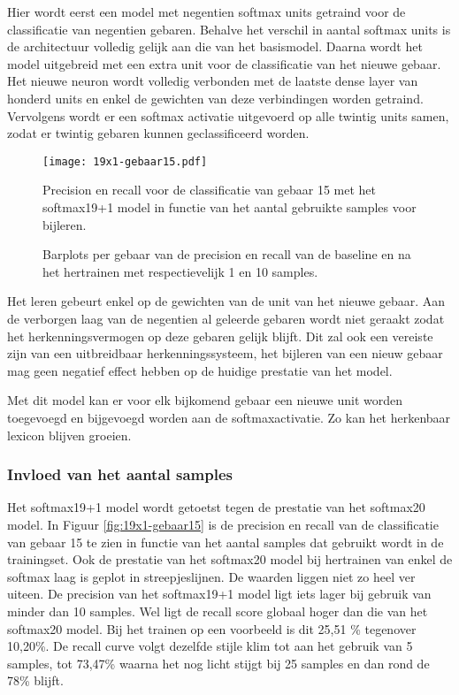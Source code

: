\npar Hier wordt eerst een model met negentien softmax units getraind voor de classificatie van negentien gebaren. Behalve het verschil in aantal softmax units is de architectuur volledig gelijk aan die van het basismodel. Daarna wordt het model uitgebreid met een extra unit voor de classificatie van het nieuwe gebaar. Het nieuwe neuron wordt volledig verbonden met de laatste dense layer van honderd units en enkel de gewichten van deze verbindingen worden getraind. Vervolgens wordt er een softmax activatie uitgevoerd op alle twintig units samen, zodat er twintig gebaren kunnen geclassificeerd worden.

\begin{figure}
	\centering
	\texttt{[image: 19x1-gebaar15.pdf]}
	\caption{Precision en recall voor de classificatie van gebaar 15 met het softmax19+1 model in functie van het aantal gebruikte samples voor bijleren.}\label{fig:19x1-gebaar15}
	
		\vspace{0.5cm}
		\def\svgwidth{1.1\columnwidth}
		
		\caption{Barplots per gebaar van de precision en recall van de baseline en na het hertrainen met respectievelijk 1 en 10 samples. }\label{fig:19x1-all}
\end{figure}

\npar Het leren gebeurt enkel op de gewichten van de unit van het nieuwe gebaar. Aan de verborgen laag van de negentien al geleerde gebaren wordt niet geraakt zodat het herkenningsvermogen op deze gebaren gelijk blijft. Dit zal ook een vereiste zijn van een uitbreidbaar herkenningssysteem, het bijleren van een nieuw gebaar mag geen negatief effect hebben op de huidige prestatie van het model.

\npar Met dit model kan er voor elk bijkomend gebaar een nieuwe unit worden toegevoegd en bijgevoegd worden aan de softmaxactivatie. Zo kan het herkenbaar lexicon  blijven groeien.

\subsubsection{Invloed van het aantal samples}

Het softmax19+1 model wordt getoetst tegen de prestatie van het softmax20 model. In Figuur \ref{fig:19x1-gebaar15} is de precision en recall van de classificatie van gebaar 15 te zien in functie van het aantal samples dat gebruikt wordt in de trainingset. Ook de prestatie van het softmax20 model bij hertrainen van enkel de softmax laag is geplot in streepjeslijnen. De waarden liggen niet zo heel ver uiteen. De precision van het softmax19+1 model ligt iets lager bij gebruik van minder dan 10 samples. Wel ligt de recall score globaal hoger dan die van het softmax20 model. Bij het trainen op een voorbeeld is dit 25,51 \% tegenover 10,20\%. De recall curve volgt dezelfde stijle klim tot aan het gebruik van 5 samples, tot 73,47\% waarna het nog licht stijgt bij 25 samples en dan rond de 78\% blijft.


